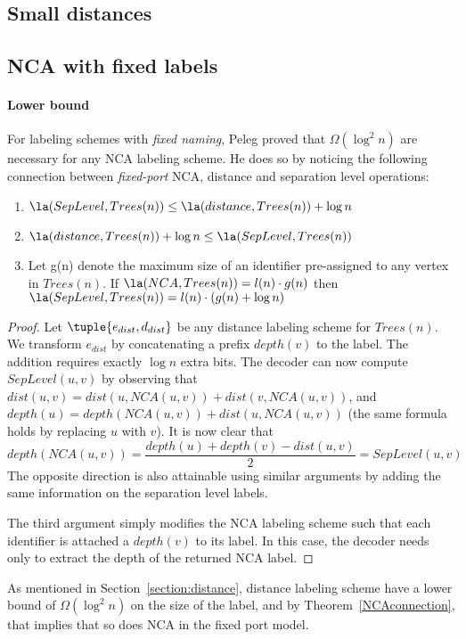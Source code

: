 
\subsection{Small distances}\label{section:Sma}



\subsection{NCA with fixed labels}
\paragraph{Lower bound}
		For labeling schemes with \emph{fixed naming}, Peleg proved that  $\Omega(\log^2 n)$ are necessary for any NCA labeling scheme.
		He does so by noticing  \cite{Peleg05} the following connection between \emph{fixed-port} NCA, distance and separation level operations:
			\begin{thm}\label{NCAconnection}
			\mbox{}
			\begin{enumerate}
			\item $\la(SepLevel,Trees(n)) \leq \la(distance, Trees(n))+ \log n$
			\item $\la(distance, Trees(n))+ \log n \leq \la(SepLevel,Trees(n))$
			\item Let g(n) denote the maximum size of an identifier pre-assigned to any vertex in $Trees(n)$. If $\la(NCA, Trees(n)) = l(n) \cdot g(n)$ then $\la(SepLevel,Trees(n)) = l(n) \cdot (g(n) + \log n)$ 
			\end{enumerate}
			\end{thm}
			\begin{proof}
			Let $\tuple{e_{dist},d_{dist}}$ be any distance labeling scheme for $Trees(n)$.
			We transform $e_{dist}$ by concatenating a prefix  $depth(v)$ to the label. The addition requires exactly $\log n$ extra bits.
			The decoder can now compute $SepLevel(u,v)$ by   observing that 
			$dist(u,v) = dist(u,NCA(u,v))+dist(v,NCA(u,v))$, and $depth(u)=depth(NCA(u,v))+dist(u,NCA(u,v))$ (the same formula holds by replacing $u$ with $v$).
			 It is now clear that  $$depth(NCA(u,v)) =  \frac{depth(u)+depth(v)-dist(u,v)}{2} = SepLevel(u,v)$$
			 The opposite direction is also attainable using similar arguments  by adding the same information on the separation level labels.
			 
			 The third argument simply modifies the NCA labeling scheme such that each identifier is attached a $depth(v)$ to its label. In this case, the decoder needs only to extract the depth of the returned NCA label.
			 
			\end{proof}
			As mentioned in Section~\ref{section:distance}, distance labeling scheme have a lower bound of $\Omega(\log^2 n)$ on the size of the label, and by Theorem~\ref{NCAconnection}, that implies that so does NCA in the fixed port model.
	

